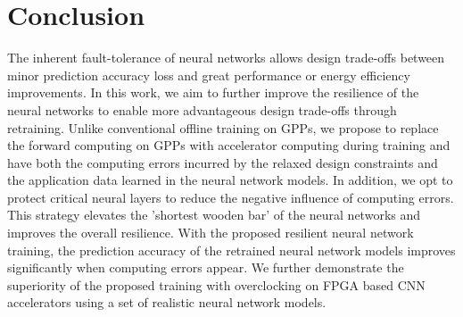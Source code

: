 \section{Conclusion} \label{sec:Conclusion}
The inherent fault-tolerance of neural networks allows design trade-offs between 
minor prediction accuracy loss and great performance or energy efficiency improvements. 
In this work, we aim to further improve the resilience of the neural networks to enable 
more advantageous design trade-offs through retraining. Unlike conventional offline training on GPPs, 
we propose to replace the forward computing on GPPs with accelerator computing during training and have both the computing 
errors incurred by the relaxed design constraints and the application data learned in the neural network models. 
In addition, we opt to protect critical neural layers to reduce the negative 
influence of computing errors. This strategy elevates the 'shortest wooden bar' of 
the neural networks and improves the overall resilience. With the proposed resilient neural network training, 
the prediction accuracy of the retrained neural network models improves significantly 
when computing errors appear. We further demonstrate the superiority of the proposed training 
with overclocking on FPGA based CNN accelerators using a set of realistic neural network models.



